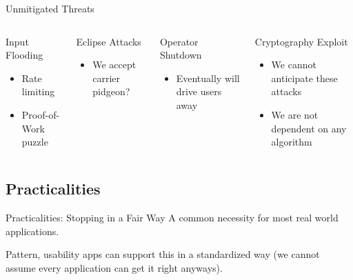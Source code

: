 \begin{frame}{Unmitigated Threats}
    \begin{columns}[T,onlytextwidth]

        \begin{block}{Input Flooding}
          \begin{itemize}
              \item Rate limiting
              \item Proof-of-Work puzzle
          \end{itemize}
        \end{block}

        \begin{block}{Eclipse Attacks}
            \begin{itemize}
                \item We accept carrier pidgeon?
            \end{itemize}
        \end{block}


        \begin{block}{Operator Shutdown}
            \begin{itemize}
                \item Eventually will drive users away
            \end{itemize}
        \end{block}

        \begin{block}{Cryptography Exploit}
            \begin{itemize}
                \item We cannot anticipate these attacks
                \item We are not dependent on any algorithm
            \end{itemize}
        \end{block}

      \end{columns}
\end{frame}

\subsection{Practicalities}

\begin{frame}{Practicalities: Stopping in a Fair Way}
    A common necessity for most real world applications.

    Pattern, usability apps can support this in a standardized way (we cannot assume every application can get it right anyways).
\end{frame}

